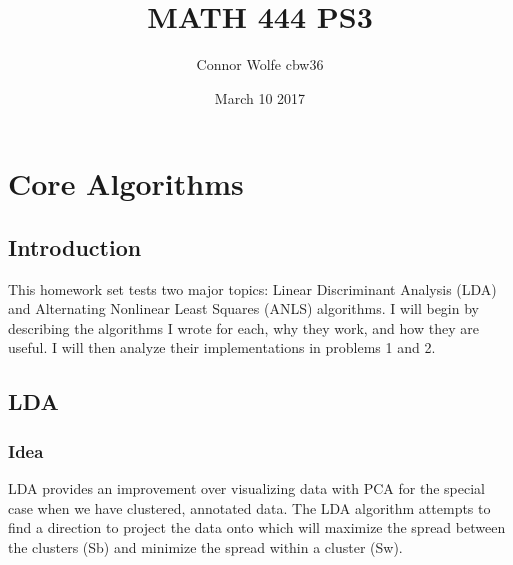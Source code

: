 \documentclass{article}
\title{MATH 444 PS3}
\author{Connor Wolfe cbw36 }
\date{March 10 2017}
\begin{document}
\maketitle

\section*{Core Algorithms}
\subsection*{Introduction}
This homework set tests two major topics: Linear Discriminant Analysis (LDA) and Alternating Nonlinear Least Squares (ANLS) algorithms.  I will begin by describing the algorithms I wrote for each, why they work, and how they are useful.  I will then analyze their implementations in problems 1 and 2.  
\subsection*{LDA}
\subsubsection*{Idea}
    LDA provides an improvement over visualizing data with PCA for the special case when we have clustered, annotated data. The LDA algorithm attempts to find a direction to project the data onto which will maximize the spread between the clusters (Sb) and minimize the spread within a cluster (Sw).  
\end{document}
